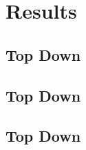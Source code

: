 \section{Results}\label{sec:results}
\subsection{Top Down}\label{subsec:results_top_down}
\subsection{Top Down}\label{subsec:results_bottom_up}
\subsection{Top Down}\label{subsec:results_value_theory}
